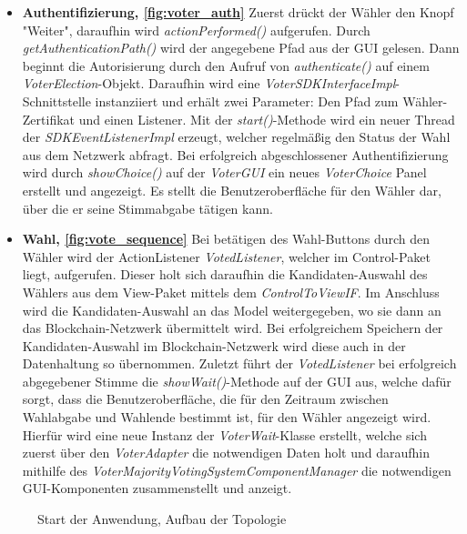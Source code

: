 \documentclass[parskip=full]{scrartcl}
\newcommand{\fakeparagraph}[1]{\textbf{#1}}
\begin{document}
\begin{itemize}
	\item\fakeparagraph{Authentifizierung, \autoref{fig:voter_auth}} Zuerst drückt der Wähler den Knopf "Weiter", daraufhin wird \textit{actionPerformed()} aufgerufen.
	Durch \textit{getAuthenticationPath()} wird der angegebene Pfad aus der GUI gelesen.
	Dann beginnt die Autorisierung durch den Aufruf von \textit{authenticate()} auf einem \textit{VoterElection}-Objekt.
	Daraufhin wird eine \textit{VoterSDKInterfaceImpl}-Schnittstelle instanziiert und erhält zwei Parameter: Den Pfad zum Wähler-Zertifikat und einen Listener.
	Mit der \textit{start()}-Methode wird ein neuer Thread der \textit{SDKEventListenerImpl} erzeugt, welcher regelmäßig den Status der Wahl aus dem Netzwerk abfragt.
	Bei erfolgreich abgeschlossener Authentifizierung wird durch \textit{showChoice()} auf der \textit{VoterGUI} ein neues \textit{VoterChoice} Panel erstellt und angezeigt. Es stellt die Benutzeroberfläche für den Wähler dar, über die er seine Stimmabgabe tätigen kann.
	
	\item\fakeparagraph{Wahl, \autoref{fig:vote_sequence} } Bei betätigen des Wahl-Buttons durch den Wähler wird der ActionListener \textit{VotedListener}, welcher im Control-Paket liegt, aufgerufen. Dieser holt sich daraufhin die Kandidaten-Auswahl des Wählers aus dem View-Paket mittels dem \textit{ControlToViewIF}. Im Anschluss wird die Kandidaten-Auswahl an das Model weitergegeben, wo sie dann an das Blockchain-Netzwerk übermittelt wird. Bei erfolgreichem Speichern der Kandidaten-Auswahl im Blockchain-Netzwerk wird diese auch in der Datenhaltung so übernommen. Zuletzt führt der \textit{VotedListener} bei erfolgreich abgegebener Stimme die \textit{showWait()}-Methode auf der GUI aus, welche dafür sorgt, dass die Benutzeroberfläche, die für den Zeitraum zwischen Wahlabgabe und Wahlende bestimmt ist, für den Wähler angezeigt wird. Hierfür wird eine neue Instanz der \textit{VoterWait}-Klasse erstellt, welche sich zuerst über den \textit{VoterAdapter} die notwendigen Daten holt und daraufhin mithilfe des \textit{VoterMajorityVotingSystemComponentManager} die notwendigen GUI-Komponenten zusammenstellt und anzeigt.
	
	\end{itemize}
	\newpage
	\pagestyle{empty}
		\begin{figure}
		\centering
		\hspace{-100pt}
		\centerline{}
		\caption{Start der Anwendung, Aufbau der Topologie}
		\label{fig:main_thread}
	\end{figure}
\end{document}
